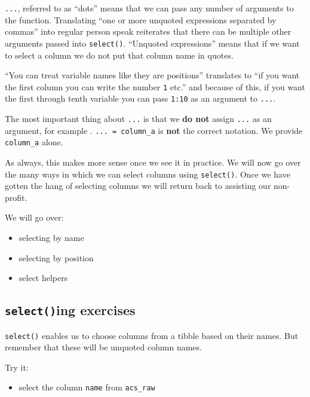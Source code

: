 \documentclass[
]{book}
\providecommand{\tightlist}{%
  \setlength{\itemsep}{0pt}\setlength{\parskip}{0pt}}
\begin{document}
\texttt{...}, referred to as ``dots'' means that we can pass any number of arguments to the function. Translating ``one or more unquoted expressions separated by commas'' into regular person speak reiterates that there can be multiple other arguments passed into \texttt{select()}. ``Unquoted expressions'' means that if we want to select a column we do not put that column name in quotes.

``You can treat variable names like they are positions'' translates to ``if you want the first column you can write the number \texttt{1} etc.'' and because of this, if you want the first through tenth variable you can pass \texttt{1:10} as an argument to \texttt{...}.

The most important thing about \texttt{...} is that we \textbf{do not} assign \texttt{...} as an argument, for example . \texttt{...\ =\ column\_a} is \textbf{not} the correct notation. We provide \texttt{column\_a} alone.

As always, this makes more sense once we see it in practice. We will now go over the many ways in which we can select columns using \texttt{select()}. Once we have gotten the hang of selecting columns we will return back to assisting our non-profit.

We will go over:

\begin{itemize}
\tightlist
\item
  selecting by name
\item
  selecting by position
\item
  select helpers
\end{itemize}

\hypertarget{selecting-exercises}{%
\subsection{\texorpdfstring{\texttt{select()}ing exercises}{select()ing exercises}}\label{selecting-exercises}}

\texttt{select()} enables us to choose columns from a tibble based on their names. But remember that these will be unquoted column names.

Try it:

\begin{itemize}
\tightlist
\item
  select the column \texttt{name} from \texttt{acs\_raw}
\end{itemize}
\end{document}
